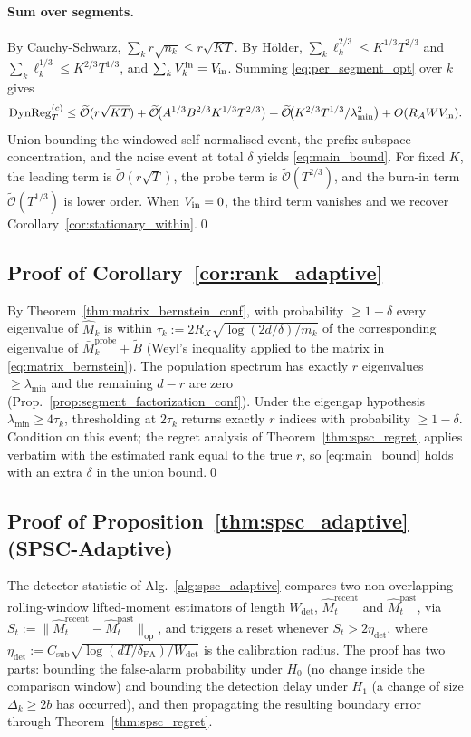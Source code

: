 \documentclass{article}
\newcommand{\op}{\mathrm{op}}
\newcommand{\cA}{\mathcal{A}}
\newcommand{\tilO}{\widetilde{\mathcal{O}}}
\newcommand{\DynReg}{\mathrm{DynReg}}
\begin{document}
\paragraph{Sum over segments.} By Cauchy-Schwarz,
$\sum_k r\sqrt{n_k}\le r\sqrt{KT}$. By H\"older,
$\sum_k\ell_k^{2/3}\le K^{1/3}T^{2/3}$ and
$\sum_k\ell_k^{1/3}\le K^{2/3}T^{1/3}$, and $\sum_k V_k^{\rm in}=V_{\rm in}$.
Summing \eqref{eq:per_segment_opt} over $k$ gives
\[
\DynReg_T^{(c)}
\le \tilO(r\sqrt{KT})
+ \tilO\!\bigl(A^{1/3}B^{2/3}K^{1/3}T^{2/3}\bigr)
+ \tilO\!\bigl(K^{2/3}T^{1/3}/\lambda_{\min}^2\bigr)
+ O(R_\cA W V_{\rm in}).
\]
Union-bounding the windowed self-normalised event, the prefix
subspace concentration, and the noise event at total $\delta$
yields \eqref{eq:main_bound}. For fixed $K$, the leading term is
$\tilO(r\sqrt T)$, the probe term is $\tilO(T^{2/3})$, and the
burn-in term $\tilO(T^{1/3})$ is lower order. When $V_{\rm in}=0$,
the third term vanishes and we recover
Corollary~\ref{cor:stationary_within}.\qed

\subsection{Proof of Corollary~\ref{cor:rank_adaptive}}
\label{app:proof_adaptive_rank}

By Theorem~\ref{thm:matrix_bernstein_conf}, with probability
$\ge 1-\delta$ every eigenvalue of $\widehat M_k$ is within
$\tau_k := 2R_X\sqrt{\log(2d/\delta)/m_k}$ of the corresponding
eigenvalue of $\bar M_k^{\mathrm{probe}} + \widetilde B$ (Weyl's
inequality applied to the matrix in
\eqref{eq:matrix_bernstein}). The population spectrum has exactly $r$
eigenvalues $\ge\lambda_{\min}$ and the remaining $d-r$ are zero
(Prop.~\ref{prop:segment_factorization_conf}). Under the eigengap
hypothesis $\lambda_{\min}\ge 4\tau_k$, thresholding at $2\tau_k$
returns exactly $r$ indices with probability $\ge 1-\delta$. Condition
on this event; the regret analysis of Theorem~\ref{thm:spsc_regret}
applies verbatim with the estimated rank equal to the true $r$, so
\eqref{eq:main_bound} holds with an extra $\delta$ in the union bound.\qed

\subsection{Proof of Proposition~\ref{thm:spsc_adaptive} (SPSC-Adaptive)}
\label{app:proof_adaptive}

The detector statistic of Alg.~\ref{alg:spsc_adaptive} compares two
non-overlapping rolling-window lifted-moment estimators of length
$W_{\mathrm{det}}$,
$\widehat M_t^{\mathrm{recent}}$ and
$\widehat M_t^{\mathrm{past}}$, via
$S_t := \|\widehat M_t^{\mathrm{recent}}-\widehat M_t^{\mathrm{past}}\|_{\op}$,
and triggers a reset whenever $S_t>2\eta_{\mathrm{det}}$, where
$\eta_{\mathrm{det}} := C_{\mathrm{sub}}\sqrt{\log(dT/\delta_{\mathrm{FA}})/W_{\mathrm{det}}}$
is the calibration radius. The proof has two parts: bounding the
false-alarm probability under $H_0$ (no change inside the comparison
window) and bounding the detection delay under $H_1$ (a change of
size $\Delta_k\ge 2b$ has occurred), and then propagating the
resulting boundary error through Theorem~\ref{thm:spsc_regret}.
\end{document}
